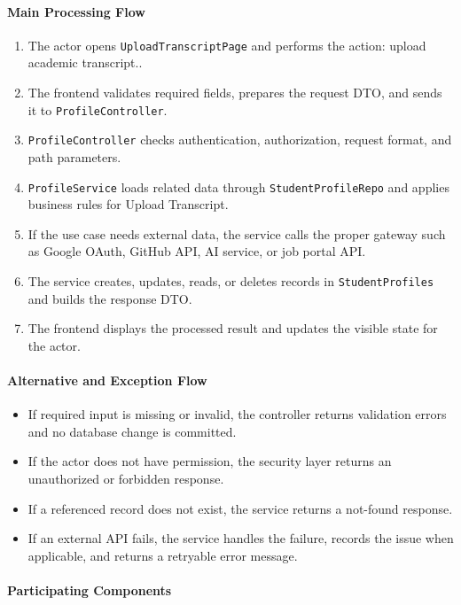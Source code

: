 \paragraph{Main Processing Flow}

\begin{enumerate}
    \item The actor opens \texttt{UploadTranscriptPage} and performs the action: upload academic transcript..
    \item The frontend validates required fields, prepares the request DTO, and sends it to \texttt{ProfileController}.
    \item \texttt{ProfileController} checks authentication, authorization, request format, and path parameters.
    \item \texttt{ProfileService} loads related data through \texttt{StudentProfileRepo} and applies business rules for Upload Transcript.
    \item If the use case needs external data, the service calls the proper gateway such as Google OAuth, GitHub API, AI service, or job portal API.
    \item The service creates, updates, reads, or deletes records in \texttt{StudentProfiles} and builds the response DTO.
    \item The frontend displays the processed result and updates the visible state for the actor.
\end{enumerate}

\paragraph{Alternative and Exception Flow}

\begin{itemize}
    \item If required input is missing or invalid, the controller returns validation errors and no database change is committed.
    \item If the actor does not have permission, the security layer returns an unauthorized or forbidden response.
    \item If a referenced record does not exist, the service returns a not-found response.
    \item If an external API fails, the service handles the failure, records the issue when applicable, and returns a retryable error message.
\end{itemize}

\paragraph{Participating Components}

